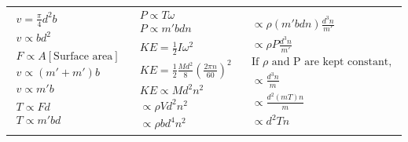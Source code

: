 \documentclass{article}
\begin{document}
\begin{tabularx}{\textwidth}{X|X|X}
  \centering 
  \begin{align*}
    v = \frac{\pi}{4} d^2 b \\ 
    v \propto bd^2 \\
     \\
    F \propto A  \left[\text{Surface area}\right]\\
    v \propto (m'+m')b \\
    v \propto m'b \\
    \\
    T \propto Fd \\
    T \propto m'bd\\
  \end{align*} & 
  \begin{align*}
    P \propto T \omega\\
    P \propto m'bdn \\
    \\
    KE = \frac{1}{2} I \omega^2 \\
    KE = \frac{1}{2} \frac{Md^2}{8} \left(\frac{2\pi n}{60}\right)^2\\
    KE \propto Md^2n^2 \\
    \propto \rho V d^2 n^2 \\
    \propto \rho b d^4 n^2 
  \end{align*} &
  \begin{align*}
    \propto \rho \left(m'bdn\right) \frac{d^3n}{m'} \\
    \propto \rho P \frac{d^3 n}{m'}\\
    \text{If } \rho \text{ and P are kept constant,}\\
    \propto \frac{d^3 n}{m} \\
    \propto \frac{d^2\left(mT\right)n}{m} \\
    \propto d^2 T n 
  \end{align*} 
\end{tabularx}
\end{document}
